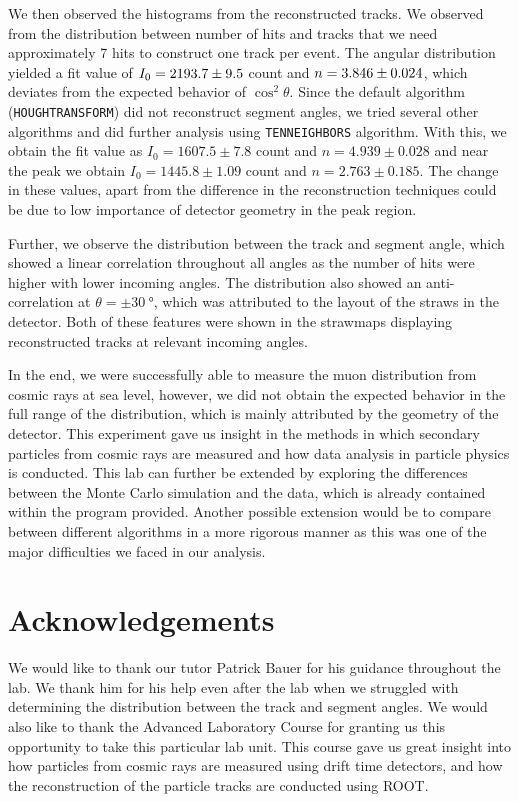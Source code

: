 \documentclass[a4paper]{report}
\numberwithin{equation}{section}
\begin{document}
We then observed the histograms from the reconstructed tracks. We observed from the distribution between number of hits and tracks 
that we need approximately 7 hits to construct one track per event. The angular distribution yielded a fit value of 
$I_0 = \num{2193.7 \pm 9.5}$ count and $n = \num{3.846 \pm 0.024}$, which deviates from the expected behavior of 
$\cos^2 \theta$. Since the default algorithm (\texttt{HOUGHTRANSFORM}) did not reconstruct segment angles, we tried
 several other algorithms and did further analysis using \texttt{TENNEIGHBORS} algorithm.
  With this, we obtain the fit value as $I_0 = 1607.5 \pm 7.8$ count and $n = 4.939 \pm 0.028$ and 
  near the peak we obtain $I_0 = 1445.8 \pm 1.09$ count and $n = 2.763 \pm 0.185$. The change in these values, 
  apart from the difference in the reconstruction techniques could be due to low importance of detector geometry in the peak region. \par 

Further, we observe the distribution between the track and segment angle, which showed a linear correlation throughout 
all angles as the number of hits were higher with lower incoming angles. The distribution also showed an anti-correlation 
at $\theta = \pm \SI{30}{\degree}$, which was attributed to the layout of the straws in the detector. Both of these features were 
shown in the strawmaps displaying reconstructed tracks at relevant incoming angles.\par 

In the end, we were successfully able to measure the muon distribution from cosmic rays at sea level, however, we did not obtain
the expected behavior in the full range of the distribution, which is mainly attributed by the geometry of the detector. 
This experiment gave us insight in the methods in which secondary particles from cosmic rays are measured and 
how data analysis in particle physics is conducted. This lab can further be extended by exploring the differences between 
the Monte Carlo simulation and the data, which is already contained within the program provided. Another possible extension would 
be to compare between different algorithms in a more rigorous manner as this was one of the major difficulties we faced in our 
analysis. 


\chapter{Acknowledgements} \label{chap:ackn}

We would like to thank our tutor Patrick Bauer for his guidance throughout the lab. We thank him for his help even after the lab 
when we struggled with determining the distribution between the track and segment angles. We would also like to thank the Advanced 
Laboratory Course for granting us this opportunity to take this particular lab unit. This course gave us great insight into 
how particles from cosmic rays are measured using drift time detectors, and how the reconstruction of the particle tracks are 
conducted using ROOT. 
\end{document}
